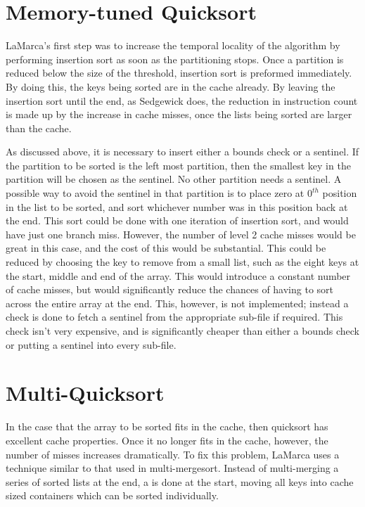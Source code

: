 \section{Memory-tuned Quicksort}

LaMarca's first step was to increase the temporal locality of the algorithm by
performing insertion sort as soon as the partitioning stops. Once a partition is
reduced below the size of the threshold, insertion sort is preformed
immediately. By doing this, the keys being sorted are in the cache already. By
leaving the insertion sort until the end, as Sedgewick does, the reduction in
instruction count is made up by the increase in cache misses, once the
lists being sorted are larger than the cache. 

As discussed above, it is necessary to insert either a bounds check or a
sentinel.  If the partition to be sorted is the left most partition, then the
smallest key in the partition will be chosen as the sentinel. No other
partition needs a sentinel. A possible way to avoid the sentinel in that
partition is to place zero at $0^{th}$ position in the list to be sorted, and
sort whichever number was in this position back at the end. This sort could be
done with one iteration of insertion sort, and would have just one branch miss.
However, the number of level 2 cache misses would be great in this case,
and the cost of this would be substantial. This could be reduced by
choosing the key to remove from a small list, such as the eight keys at the
start, middle and end of the array. This would introduce a constant number of
cache misses, but would significantly reduce the chances of having to sort
across the entire array at the end. This, however, is not implemented; instead a
check is done to fetch a sentinel from the appropriate sub-file if required. This
check isn't very expensive, and is significantly cheaper than either a bounds
check or putting a sentinel into every sub-file.

\section{Multi-Quicksort}

In the case that the array to be sorted fits in the cache, then quicksort has
excellent cache properties. Once it no longer fits in the cache, however, the
number of misses increases dramatically. To fix this problem, LaMarca uses a
technique similar to that used in multi-mergesort. Instead of multi-merging a
series of sorted lists at the end, a  is done at the start,
moving all keys into cache sized containers which can be sorted individually.

